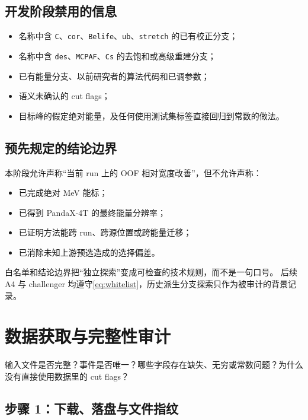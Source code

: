 \documentclass[UTF8,12pt,a4paper,oneside,fontset=none]{ctexart}
\numberwithin{equation}{section}
\begin{document}
\subsection{开发阶段禁用的信息}

\begin{itemize}
  \item 名称中含 \texttt{C}、\texttt{cor}、\texttt{Belife}、\texttt{ub}、\texttt{stretch} 的已有校正分支；
  \item 名称中含 \texttt{des}、\texttt{MCPAF}、\texttt{Cs} 的去饱和或高级重建分支；
  \item 已有能量分支、以前研究者的算法代码和已调参数；
  \item 语义未确认的 cut flags；
  \item 目标峰的假定绝对能量，及任何使用测试集标签直接回归到常数的做法。
\end{itemize}

\subsection{预先规定的结论边界}

本阶段允许声称“当前 run 上的 OOF 相对宽度改善”，但不允许声称：

\begin{itemize}
  \item 已完成绝对 MeV 能标；
  \item 已得到 PandaX-4T 的最终能量分辨率；
  \item 已证明方法能跨 run、跨源位置或跨能量迁移；
  \item 已消除未知上游预选造成的选择偏差。
\end{itemize}

\begin{conclusionbox}
白名单和结论边界把“独立探索”变成可检查的技术规则，而不是一句口号。
后续 A4 与 challenger 均遵守\cref{eq:whitelist}，历史派生分支探索只作为被审计的背景记录。
\end{conclusionbox}

\section{数据获取与完整性审计}

\begin{questionbox}
输入文件是否完整？事件是否唯一？哪些字段存在缺失、无穷或常数问题？为什么没有直接使用数据里的 cut flags？
\end{questionbox}

\subsection{步骤 1：下载、落盘与文件指纹}
\end{document}

